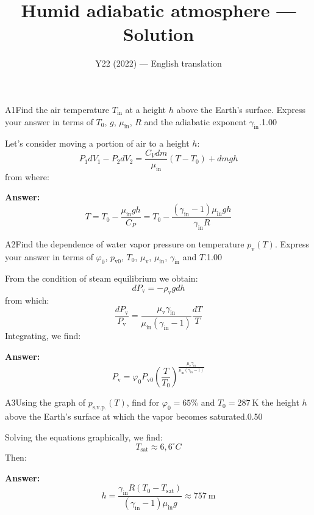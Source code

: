 \documentclass[11pt,a4paper]{article}
\title{\textbf{Humid adiabatic atmosphere --- Solution}}
\author{\normalsize Y22 (2022) — English translation}
\date{}
\begin{document}
\maketitle\vspace{-0.5em}
\begin{solcard}{A1}{Find the air temperature $T_\text{in}$ at a height $h$ above the Earth's surface. Express your answer in terms of $T_0$, $g$, $\mu_\text{in}$, $R$ and the adiabatic exponent $\gamma_\text{in}$.}{1.00}

Let's consider moving a portion of air to a height $h$: $$P_1dV_1-P_2dV_2=\frac{C_Vdm}{\mu_\text{in}}(T-T_0)+dmgh $$ from where:

\par\smallskip\noindent\textbf{Answer:} $$T=T_0-\frac{\mu_\text{in}gh}{C_P}=T_0-\frac{(\gamma_\text{in}-1)\mu_\text{in}gh}{\gamma_\text{in}R} $$
\end{solcard}

\begin{solcard}{A2}{Find the dependence of water vapor pressure on temperature $p_\text{v}(T)$. Express your answer in terms of $\varphi_0$, $p_{\text{v}0}$, $T_0$, $\mu_\text{v}$, $\mu_\text{in}$, $\gamma_\text{in}$ and $T$.}{1.00}

From the condition of steam equilibrium we obtain: $$dP_\text{v}=-\rho_\text{v}gdh $$ from which: $$\frac{dP_\text{v}}{P_\text{v}}=\frac{\mu_\text{v}\gamma_\text{in}}{\mu_\text{in}(\gamma_\text{in}-1)}\frac{dT}{T} $$ Integrating, we find:

\par\smallskip\noindent\textbf{Answer:} $$P_\text{v}=\varphi_0P_{\text{v}0}\left(\frac{T}{T_0}\right)^{\frac{\mu_\text{v}\gamma_\text{in}}{\mu_\text{in}(\gamma_\text{in}-1)}} $$
\end{solcard}

\begin{solcard}{A3}{Using the graph of $p_\text{s.v.p.}(T)$, find for $\varphi_0=65\text{\%}$ and $T_0=287~\text{K}$ the height $h$ above the Earth's surface at which the vapor becomes saturated.}{0.50}

Solving the equations graphically, we find: $$T_\text{sat}\approx{6{,}6^\circ C} $$Then:

\par\smallskip\noindent\textbf{Answer:} $$h=\displaystyle\frac{\gamma_\text{in}R(T_0-T_\text{sat})}{(\gamma_\text{in}-1)\mu_\text{in}g}\approx{757~\text{m}} $$
\end{solcard}
\end{document}
